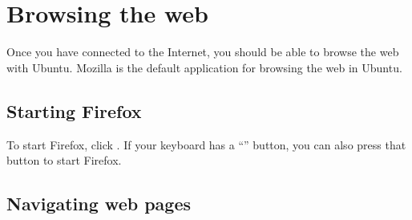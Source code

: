 \begin{comment}

  Most core Firefox help content here is adapted from Firefox 
  help documentation, licensed under the CC-BY-SA 3.0 license.


  The following people are listed for attribution at the time of copy:

    * Chris\_Ilias
    * Bo
    * underpass
    * mozilla\_help\_viewer\_project


  The following people are listed for attribution at the time of copy:

    * Bo
    * jehurd
    * cl58
    * underpass
    * kjhass
    * djstsys
    * Chris\_Ilias
    * mozilla\_help\_viewer\_project

\end{comment}

\section{Browsing the web}

Once you have connected to the Internet, you should be able to browse
the web with Ubuntu. Mozilla  is the default 
application for browsing the web in Ubuntu.


\subsection{Starting Firefox}

To start Firefox, click . If your keyboard has a ``'' button, you can also press that button to start Firefox.

\subsection{Navigating web pages}

